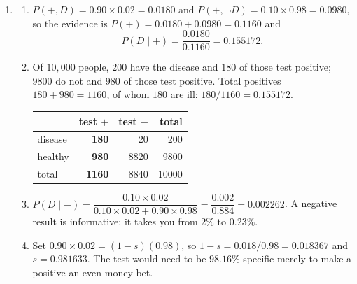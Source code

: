 \documentclass[11pt]{article}
\begin{document}
\begin{enumerate}[leftmargin=*, itemsep=0.7em]

\item
  \begin{enumerate}[label=(\alph*)]
    \item $P(+, D) = 0.90 \times 0.02 = \mathbf{0.0180}$ and
      $P(+, \lnot D) = 0.10 \times 0.98 = \mathbf{0.0980}$, so the evidence
      is $P(+) = 0.0180 + 0.0980 = \mathbf{0.1160}$ and
      \[
        P(D \mid +) = \frac{0.0180}{0.1160} = \mathbf{0.155172}.
      \]
    \item Of $10{,}000$ people, $200$ have the disease and $180$ of those
      test positive; $9800$ do not and $980$ of those test positive. Total
      positives $180 + 980 = 1160$, of whom $180$ are ill:
      $180/1160 = \mathbf{0.155172}$.

      \begin{center}\small
      \begin{tabular}{@{}lrrr@{}}
      \toprule
       & test $+$ & test $-$ & total\\
      \midrule
      disease & \textbf{180} & 20 & 200\\
      healthy & \textbf{980} & 8820 & 9800\\
      \midrule
      total & \textbf{1160} & 8840 & 10000\\
      \bottomrule
      \end{tabular}
      \end{center}
    \item $P(D \mid -) = \dfrac{0.10 \times 0.02}
      {0.10 \times 0.02 + 0.90 \times 0.98}
      = \dfrac{0.002}{0.884} = \mathbf{0.002262}$. A negative result is
      informative: it takes you from $2\%$ to $0.23\%$.
    \item Set $0.90 \times 0.02 = (1 - s)(0.98)$, so
      $1 - s = 0.018/0.98 = 0.018367$ and
      $s = \mathbf{0.981633}$. The test would need to be $98.16\%$ specific
      merely to make a positive an even-money bet.
  \end{enumerate}


\end{enumerate}
\end{document}
